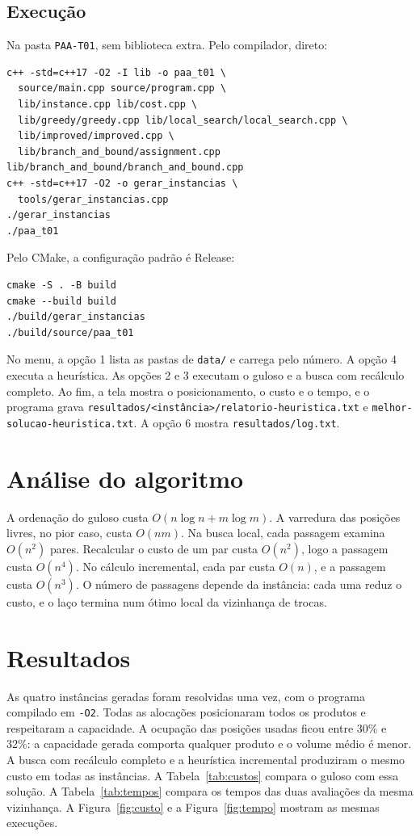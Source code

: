 \documentclass[conference,a4paper]{IEEEtran}
\begin{document}
\subsection{Execução}
Na pasta \texttt{PAA-T01}, sem biblioteca extra.
Pelo compilador, direto:
\begin{verbatim}
c++ -std=c++17 -O2 -I lib -o paa_t01 \
  source/main.cpp source/program.cpp \
  lib/instance.cpp lib/cost.cpp \
  lib/greedy/greedy.cpp lib/local_search/local_search.cpp \
  lib/improved/improved.cpp \
  lib/branch_and_bound/assignment.cpp lib/branch_and_bound/branch_and_bound.cpp
c++ -std=c++17 -O2 -o gerar_instancias \
  tools/gerar_instancias.cpp
./gerar_instancias
./paa_t01
\end{verbatim}
Pelo CMake, a configuração padrão é Release:
\begin{verbatim}
cmake -S . -B build
cmake --build build
./build/gerar_instancias
./build/source/paa_t01
\end{verbatim}
No menu, a opção 1 lista as pastas de \texttt{data/} e carrega pelo número.
A opção 4 executa a heurística.
As opções 2 e 3 executam o guloso e a busca com recálculo completo.
Ao fim, a tela mostra o posicionamento, o custo e o tempo, e o programa grava \texttt{resultados/<instância>/relatorio-heuristica.txt} e \texttt{melhor-solucao-heuristica.txt}.
A opção 6 mostra \texttt{resultados/log.txt}.

\section{Análise do algoritmo}
A ordenação do guloso custa \(O(n \log n + m \log m)\).
A varredura das posições livres, no pior caso, custa \(O(nm)\).
Na busca local, cada passagem examina \(O(n^2)\) pares.
Recalcular o custo de um par custa \(O(n^2)\), logo a passagem custa \(O(n^4)\).
No cálculo incremental, cada par custa \(O(n)\), e a passagem custa \(O(n^3)\).
O número de passagens depende da instância: cada uma reduz o custo, e o laço termina num ótimo local da vizinhança de trocas.

\section{Resultados}
As quatro instâncias geradas foram resolvidas uma vez, com o programa compilado em \texttt{-O2}.
Todas as alocações posicionaram todos os produtos e respeitaram a capacidade.
A ocupação das posições usadas ficou entre 30\% e 32\%: a capacidade gerada comporta qualquer produto e o volume médio é menor.
A busca com recálculo completo e a heurística incremental produziram o mesmo custo em todas as instâncias.
A Tabela~\ref{tab:custos} compara o guloso com essa solução.
A Tabela~\ref{tab:tempos} compara os tempos das duas avaliações da mesma vizinhança.
A Figura~\ref{fig:custo} e a Figura~\ref{fig:tempo} mostram as mesmas execuções.
\end{document}
